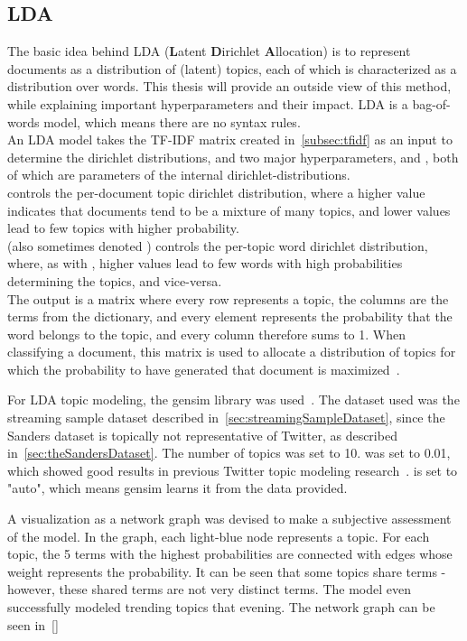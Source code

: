 \subsection{LDA}
\label{subsec:lda}

The basic idea behind LDA (\textbf{L}atent \textbf{D}irichlet \textbf{A}llocation) is to represent documents as a distribution of (latent) topics,
each of which is characterized as a distribution over words.
This thesis will provide an outside view of this method, while explaining important hyperparameters and their impact.
LDA is a bag-of-words model, which means there are no syntax rules.
\\
An LDA model takes the TF-IDF matrix created in~\ref{subsec:tfidf} as an input to determine the dirichlet distributions,
and two major hyperparameters, \alpha and \eta,
both of which are parameters of the internal dirichlet-distributions.
\\
\Alpha controls the per-document topic dirichlet distribution,
where a higher value indicates that documents tend to be a mixture of many topics,
and lower values lead to few topics with higher probability.
\\
\eta (also sometimes denoted \beta) controls the per-topic word dirichlet distribution, where, as with \alpha,
higher values lead to few words with high probabilities determining the topics,
and vice-versa.
\\
The output is a matrix where every row represents a topic,
the columns are the terms from the dictionary,
and every element represents the probability that the word belongs to the topic,
and every column therefore sums to 1.
When classifying a document, this matrix is used to allocate a distribution of topics for which the probability to have generated that document is maximized~\cite{Blei2003}.
\par
For LDA topic modeling, the gensim library was used~\cite{gensimDocs}.
The dataset used was the streaming sample dataset described in~\ref{sec:streamingSampleDataset},
since the Sanders dataset is topically not representative of Twitter, as described in~\ref{sec:theSandersDataset}.
The number of topics was set to 10.
\eta was set to 0.01, which showed good results in previous Twitter topic modeling research~\cite{Hong2010}.
\alpha is set to "auto", which means gensim learns it from the data provided.
\par
A visualization as a network graph was devised to make a subjective assessment of the model.
In the graph, each light-blue node represents a topic.
For each topic, the 5 terms with the highest probabilities are connected with edges whose weight represents the probability.
It can be seen that some topics share terms - however, these shared terms are not very distinct terms.
The model even successfully modeled trending topics that evening.
The network graph can be seen in~\ref{}

